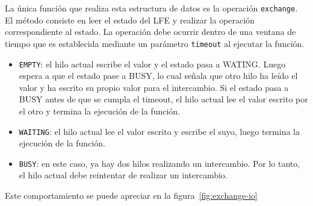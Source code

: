 La única función que realiza esta estructura de datos es la operación \texttt{exchange}. El método consiste en leer el estado del LFE y realizar la operación correspondiente al estado. La operación debe ocurrir dentro de una ventana de tiempo que es establecida mediante un parámetro \texttt{timeout} al ejecutar la función.

\begin{itemize}
\item{\texttt{EMPTY}: el hilo actual escribe el valor y el estado pasa a WATING. Luego espera a que el estado pase a BUSY, lo cual señala que otro hilo ha leído el valor y ha escrito su propio valor para el intercambio. Si el estado pasa a BUSY antes de que se cumpla el timeout, el hilo actual lee el valor escrito por el otro y termina la ejecución de la función.}
\item{\texttt{WAITING}: el hilo actual lee el valor escrito y escribe el suyo, luego termina la ejecución de la función.}
\item{\texttt{BUSY}: en este caso, ya hay dos hilos realizando un intercambio. Por lo tanto, el hilo actual debe reintentar de realizar un intercambio.}
\end{itemize}

Este comportamiento se puede apreciar en la figura~\ref{fig:exchange-io}

